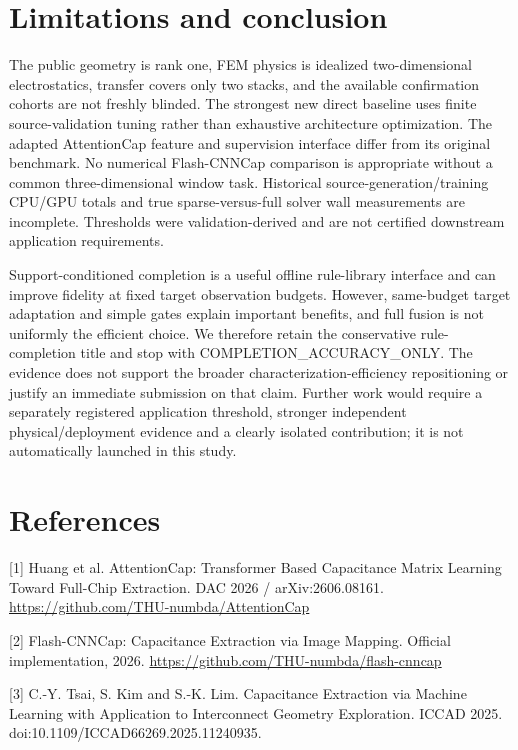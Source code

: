 \documentclass[10pt,twocolumn]{article}
\begin{document}
\section*{Limitations and conclusion}

The public geometry is rank one, FEM physics is idealized two-dimensional electrostatics, transfer covers only two stacks, and the available confirmation cohorts are not freshly blinded. The strongest new direct baseline uses finite source-validation tuning rather than exhaustive architecture optimization. The adapted AttentionCap feature and supervision interface differ from its original benchmark. No numerical Flash-CNNCap comparison is appropriate without a common three-dimensional window task. Historical source-generation/training CPU/GPU totals and true sparse-versus-full solver wall measurements are incomplete. Thresholds were validation-derived and are not certified downstream application requirements.

Support-conditioned completion is a useful offline rule-library interface and can improve fidelity at fixed target observation budgets. However, same-budget target adaptation and simple gates explain important benefits, and full fusion is not uniformly the efficient choice. We therefore retain the conservative rule-completion title and stop with COMPLETION\_ACCURACY\_ONLY. The evidence does not support the broader characterization-efficiency repositioning or justify an immediate submission on that claim. Further work would require a separately registered application threshold, stronger independent physical/deployment evidence and a clearly isolated contribution; it is not automatically launched in this study.

\section*{References}

[1] Huang et al. AttentionCap: Transformer Based Capacitance Matrix Learning Toward Full-Chip Extraction. DAC 2026 / arXiv:2606.08161. \url{https://github.com/THU-numbda/AttentionCap}

[2] Flash-CNNCap: Capacitance Extraction via Image Mapping. Official implementation, 2026. \url{https://github.com/THU-numbda/flash-cnncap}

[3] C.-Y. Tsai, S. Kim and S.-K. Lim. Capacitance Extraction via Machine Learning with Application to Interconnect Geometry Exploration. ICCAD 2025. doi:10.1109/ICCAD66269.2025.11240935.
\end{document}
